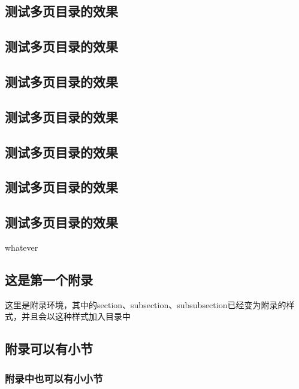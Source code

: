 \documentclass[a4paper,cs4size,UTF8,winfonts,boldfont,slantfont]{ctexart}
\begin{document}
	\subsection{测试多页目录的效果}
	\subsection{测试多页目录的效果}
	\subsection{测试多页目录的效果}
	\subsection{测试多页目录的效果}
	\subsection{测试多页目录的效果}
	\subsection{测试多页目录的效果}
	\subsection{测试多页目录的效果}
	whatever
	
	\clearpage
	
	
	\begin{appendices}
		\section{这是第一个附录}
		这里是附录环境，其中的section、subsection、subsubsection已经变为附录的样式，并且会以这种样式加入目录中
		\subsection{附录可以有小节}
		\subsubsection{附录中也可以有小小节}
	\end{appendices}
	
\end{document}
